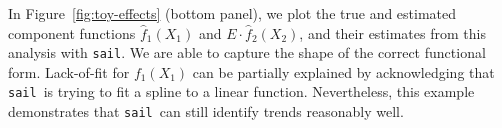 \documentclass[a4paper,fleqn]{cas-sc}
\newcommand{\sail}{\texttt{sail}}
\begin{document}
In Figure~\ref{fig:toy-effects} (bottom panel), we plot the true and estimated component functions $\hat{f}_1(X_1)$ and $E \cdot \hat{f}_2(X_2)$, and their estimates from this analysis with \texttt{sail}. 
We are able to capture the shape of the correct functional form. Lack-of-fit for $f_1(X_1)$ can be partially explained by acknowledging that \sail ~is trying to fit a spline to a linear function. 
Nevertheless, this example demonstrates that \sail ~can still identify trends reasonably well.



%
%
%


	
\end{document}
